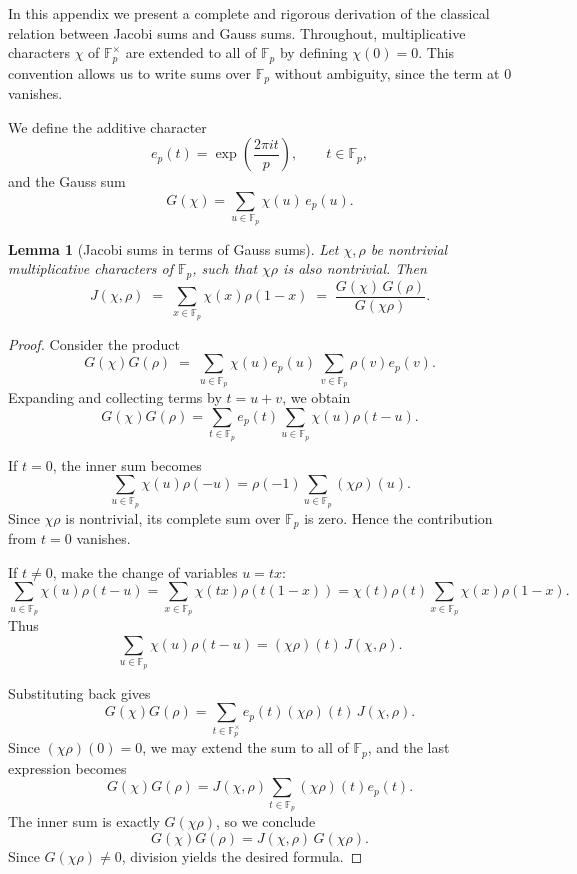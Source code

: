 \documentclass[11pt,a4paper]{article}
\theoremstyle{plain}
\newtheorem{lemma}{Lemma}
\theoremstyle{definition}
\begin{document}
In this appendix we present a complete and rigorous derivation of the classical
relation between Jacobi sums and Gauss sums.  
Throughout, multiplicative characters $\chi$ of $\mathbb{F}_p^\times$ are extended
to all of $\mathbb{F}_p$ by defining $\chi(0)=0$. This convention allows us to
write sums over $\mathbb{F}_p$ without ambiguity, since the term at $0$ vanishes.  

We define the additive character
\[
e_p(t) = \exp\!\left(\frac{2\pi i t}{p}\right), \qquad t \in \mathbb{F}_p,
\]
and the Gauss sum
\[
G(\chi) = \sum_{u\in \mathbb{F}_p} \chi(u)\, e_p(u).
\]

\begin{lemma}[Jacobi sums in terms of Gauss sums]
Let $\chi,\rho$ be nontrivial multiplicative characters of $\mathbb{F}_p$, such that
$\chi\rho$ is also nontrivial. Then
\[
J(\chi,\rho) \;=\; \sum_{x\in\mathbb{F}_p}\chi(x)\rho(1-x)
\;=\; \frac{G(\chi)\,G(\rho)}{G(\chi\rho)}.
\]
\end{lemma}

\begin{proof}
Consider the product
\[
G(\chi)G(\rho) \;=\; 
\sum_{u\in\mathbb{F}_p} \chi(u)e_p(u)\,
\sum_{v\in\mathbb{F}_p} \rho(v)e_p(v).
\]
Expanding and collecting terms by $t=u+v$, we obtain
\[
G(\chi)G(\rho) 
= \sum_{t\in\mathbb{F}_p} e_p(t) \sum_{u\in\mathbb{F}_p} \chi(u)\rho(t-u).
\]

If $t=0$, the inner sum becomes
\[
\sum_{u\in\mathbb{F}_p}\chi(u)\rho(-u) = \rho(-1)\sum_{u\in\mathbb{F}_p} (\chi\rho)(u).
\]
Since $\chi\rho$ is nontrivial, its complete sum over $\mathbb{F}_p$ is zero.
Hence the contribution from $t=0$ vanishes.

If $t\neq 0$, make the change of variables $u=tx$:
\[
\sum_{u\in\mathbb{F}_p}\chi(u)\rho(t-u)
= \sum_{x\in\mathbb{F}_p}\chi(tx)\rho(t(1-x))
= \chi(t)\rho(t)\sum_{x\in\mathbb{F}_p}\chi(x)\rho(1-x).
\]
Thus
\[
\sum_{u\in\mathbb{F}_p}\chi(u)\rho(t-u) = (\chi\rho)(t)\,J(\chi,\rho).
\]

Substituting back gives
\[
G(\chi)G(\rho) 
= \sum_{t\in\mathbb{F}_p^\times} e_p(t)(\chi\rho)(t)\,J(\chi,\rho).
\]
Since $(\chi\rho)(0)=0$, we may extend the sum to all of $\mathbb{F}_p$,
and the last expression becomes
\[
G(\chi)G(\rho) = J(\chi,\rho)\sum_{t\in\mathbb{F}_p} (\chi\rho)(t)e_p(t).
\]
The inner sum is exactly $G(\chi\rho)$, so we conclude
\[
G(\chi)G(\rho) = J(\chi,\rho)\,G(\chi\rho).
\]
Since $G(\chi\rho)\neq 0$, division yields the desired formula.
\end{proof}
\end{document}
